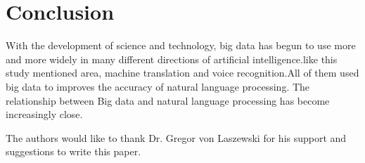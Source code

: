 \documentclass[sigconf]{acmart}
\begin{document}
\section{Conclusion}
With the development of science and technology, big data has begun to use more and more widely in many different directions of artificial intelligence.like this study mentioned area, machine translation and voice recognition.All of them used big data to improves the accuracy of natural language processing. The relationship between Big data and natural language processing has become increasingly close.


\begin{acks}

  The authors would like to thank Dr. Gregor von Laszewski for his
  support and suggestions to write this paper.

\end{acks}


 


\end{document}
